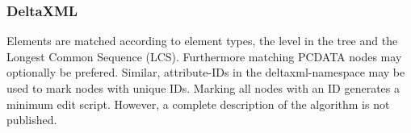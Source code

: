 



\subsubsection{DeltaXML\cite{DELTAXML}}
Elements are matched according to element types, the level in the tree and the Longest Common Sequence (LCS). Furthermore matching PCDATA nodes may optionally be prefered. Similar, attribute-IDs in the deltaxml-namespace may be used to mark nodes with unique IDs. Marking all nodes with an ID generates a minimum edit script. However, a complete description of the algorithm is not published.


